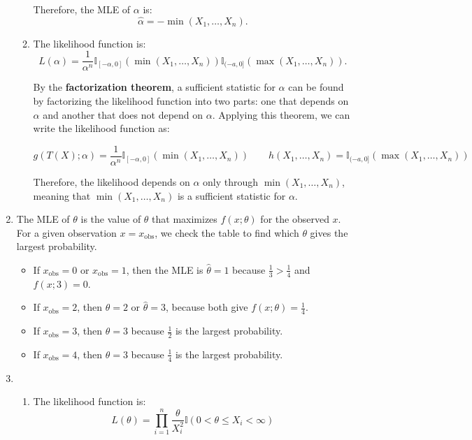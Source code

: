 \documentclass{article}
\begin{document}
\begin{enumerate}
\begin{enumerate}[label=(\roman*)]
    Therefore, the MLE of $\alpha$ is:
    \[
    \hat{\alpha} = -\min(X_1, \dots, X_n).
    \]

    \item The likelihood function is:
    \[
    L(\alpha) = \frac{1}{\alpha^n} \mathbb{I}_{[-\alpha, 0]}(\min(X_1, \dots, X_n)) \mathbb{I}_{(-a, 0]}(\max(X_1, \dots, X_n)).
    \]

    By the \textbf{factorization theorem}, a sufficient statistic for \(\alpha\) can be found by factorizing the likelihood function into two parts: one that depends on \(\alpha\) and another that does not depend on \(\alpha\). Applying this theorem, we can write the likelihood function as:

    \[
    g(T(X); \alpha) = \frac{1}{\alpha^n} \mathbb{I}_{[-\alpha, 0]}(\min(X_1, \dots, X_n)) \quad \quad
    h(X_1, \dots, X_n) = \mathbb{I}_{(-a, 0]}(\max(X_1, \dots, X_n))
    \]

    Therefore, the likelihood depends on \(\alpha\) only through \( \min(X_1, \dots, X_n) \), \\
    meaning that \( \min(X_1, \dots, X_n) \) is a sufficient statistic for \(\alpha\).
    \end{enumerate}

\item
The MLE of $\theta$ is the value of $\theta$ that maximizes $f(x; \theta)$ for the observed $x$. For a given observation $x = x_{\text{obs}}$, we check the table to find which $\theta$ gives the largest probability.

\begin{itemize}
    \item If $x_{\text{obs}} = 0$ or $x_{\text{obs}} = 1$, then the MLE is $\hat{\theta} = 1$ because $\frac{1}{3} > \frac{1}{4}$ and $f(x; 3) = 0$.
    \item If $x_{\text{obs}} = 2$, then $\hat{\theta} = 2$ or $\hat{\theta} = 3$, because both give $f(x; \theta) = \frac{1}{4}$.
    \item If $x_{\text{obs}} = 3$, then $\hat{\theta} = 3$ because $\frac{1}{2}$ is the largest probability.
    \item If $x_{\text{obs}} = 4$, then $\hat{\theta} = 3$ because $\frac{1}{4}$ is the largest probability.
\end{itemize}

\item
    \begin{enumerate}[label=(\roman*)]
    \item The likelihood function is:
    \[
    L(\theta) = \prod_{i=1}^{n} \frac{\theta}{X_i^2} \mathbb{I} (0 < \theta \leq X_i < \infty)
    \]


\end{enumerate}
\end{enumerate}
\end{document}
